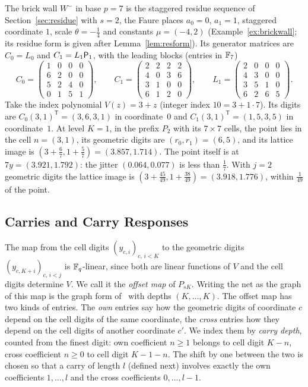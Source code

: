 \begin{example}\label{ex:running}
The brick wall $W^-$ in base $p=7$ is the staggered residue sequence of Section~\ref{sec:residue} with $s=2$, the Faure places $a_0=0$, $a_1=1$, staggered coordinate $1$, scale $\theta=-\frac14$ and constants $\mu=(-4,2)$ (Example~\ref{ex:brickwall}; its residue form is given after Lemma~\ref{lem:resform}). Its generator matrices are $C_0=L_0$ and $C_1=L_1\mathsf{P}_1$, with the leading blocks (entries in $\mathbb{F}_7$)
\[
C_0=\begin{pmatrix}1&0&0&0\\6&2&0&0\\5&2&4&0\\0&1&5&1\end{pmatrix},\qquad
C_1=\begin{pmatrix}2&2&2&2\\4&0&3&6\\3&1&0&0\\6&1&2&0\end{pmatrix},\qquad
L_1=\begin{pmatrix}2&0&0&0\\4&3&0&0\\3&5&1&0\\6&2&6&5\end{pmatrix}.
\]
Take the index polynomial $V(z)=3+z$ (integer index $10=3+1\cdot7$). Its digits are $C_0(3,1)^{\mathsf T}=(3,6,3,1)$ in coordinate~$0$ and $C_1(3,1)^{\mathsf T}=(1,5,3,5)$ in coordinate~$1$. At level $K=1$, in the prefix $P_2$ with its $7\times7$ cells, the point lies in the cell $n=(3,1)$, its geometric digits are $(r_0,r_1)=(6,5)$, and its lattice image is $(3+\frac67,1+\frac57)=(3.857,1.714)$. The point itself is at $7y=(3.921,1.792)$: the jitter $(0.064,0.077)$ is less than $\frac17$. With $j=2$ geometric digits the lattice image is $(3+\frac{45}{49},1+\frac{38}{49})=(3.918,1.776)$, within $\frac1{49}$ of the point.
\end{example}

\subsection{Carries and Carry Responses}
The map from the cell digits $(y_{c,i})_{c,\,i<K}$ to the geometric digits $(y_{c,K+i})_{c,\,i<j}$ is $\mathbb{F}_q$-linear, since both are linear functions of $V$ and the cell digits determine $V$. We call it the \emph{offset map} of $P_{sK}$. Writing the net as the graph of this map is the graph form of \cite{Gru26geo}%
\ with depths $(K,\dots,K)$. The offset map has two kinds of entries. The \emph{own} entries say how the geometric digits of coordinate $c$ depend on the cell digits of the same coordinate, the \emph{cross} entries how they depend on the cell digits of another coordinate $c'$. We index them by \emph{carry depth}, counted from the finest digit: own coefficient $n\ge1$ belongs to cell digit $K-n$, cross coefficient $n\ge0$ to cell digit $K-1-n$. The shift by one between the two is chosen so that a carry of length $l$ (defined next) involves exactly the own coefficients $1,\dots,l$ and the cross coefficients $0,\dots,l-1$.

